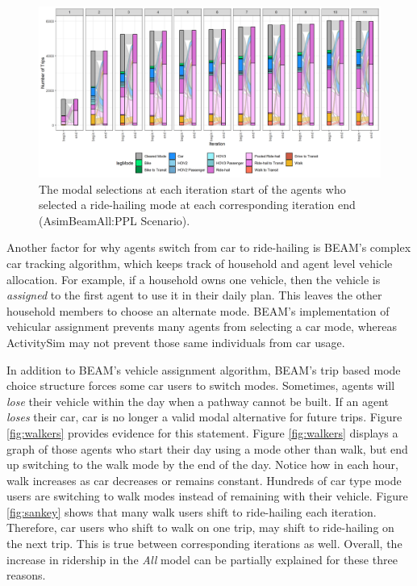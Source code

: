 \documentclass[fancy, masters]{byuthesis}
\begin{document}
\begin{figure}

\centering
\includegraphics[width = 1.05\paperwidth]{planshifts_facet.png}
\caption[Trips that switch to ride-hail by iteration.]{The modal selections at each iteration start of the agents who selected a ride-hailing mode at each corresponding iteration end (AsimBeamAll:PPL Scenario).}
\label{fig:sankey2}

\end{figure}

Another factor for why agents switch from car to ride-hailing is BEAM's complex car tracking algorithm, which keeps track of household and agent level vehicle allocation. For example, if a household owns one vehicle, then the vehicle is \emph{assigned} to the first agent to use it in their daily plan. This leaves the other household members to choose an alternate mode. BEAM's implementation of vehicular assignment prevents many agents from selecting a car mode, whereas ActivitySim may not prevent those same individuals from car usage.

In addition to BEAM's vehicle assignment algorithm, BEAM's trip based mode choice structure forces some car users to switch modes. Sometimes, agents will \emph{lose} their vehicle within the day when a pathway cannot be built. If an agent \emph{loses} their car, car is no longer a valid modal alternative for future trips. Figure \ref{fig:walkers} provides evidence for this statement. Figure \ref{fig:walkers} displays a graph of those agents who start their day using a mode other than walk, but end up switching to the walk mode by the end of the day. Notice how in each hour, walk increases as car decreases or remains constant. Hundreds of car type mode users are switching to walk modes instead of remaining with their vehicle. Figure \ref{fig:sankey} shows that many walk users shift to ride-hailing each iteration. Therefore, car users who shift to walk on one trip, may shift to ride-hailing on the next trip. This is true between corresponding iterations as well. Overall, the increase in ridership in the \emph{All} model can be partially explained for these three reasons.
\end{document}
